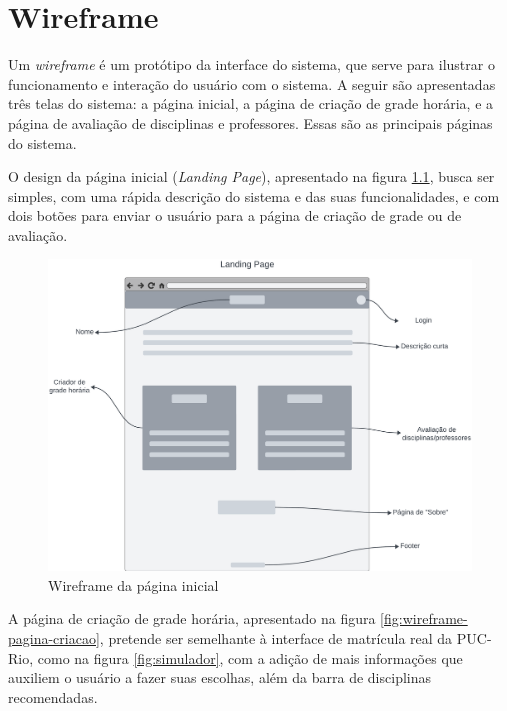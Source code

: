 \chapter{Wireframe}
\label{cha:Wireframe}

Um \textit{wireframe} é um protótipo da interface do sistema, que serve para ilustrar o funcionamento e interação do usuário com o sistema. A seguir são apresentadas três telas do sistema: a página inicial, a página de criação de grade horária, e a página de avaliação de disciplinas e professores. Essas são as principais páginas do sistema.

O design da página inicial (\textit{Landing Page}), apresentado na figura \ref{fig:wireframe-pagina-inicial}, busca ser simples, com uma rápida descrição do sistema e das suas funcionalidades, e com dois botões para enviar o usuário para a página de criação de grade ou de avaliação.

\begin{figure}[ht]
    \begin{center}
    \includegraphics[width=390pt]{figuras/pagina-inicial.png}
    \caption{Wireframe da página inicial}
    \label{fig:wireframe-pagina-inicial}
    \end{center}
\end{figure}

A página de criação de grade horária, apresentado na figura \ref{fig:wireframe-pagina-criacao}, pretende ser semelhante à interface de matrícula real da PUC-Rio, como na figura \ref{fig:simulador}, com a adição de mais informações que auxiliem o usuário a fazer suas escolhas, além da barra de disciplinas recomendadas.

